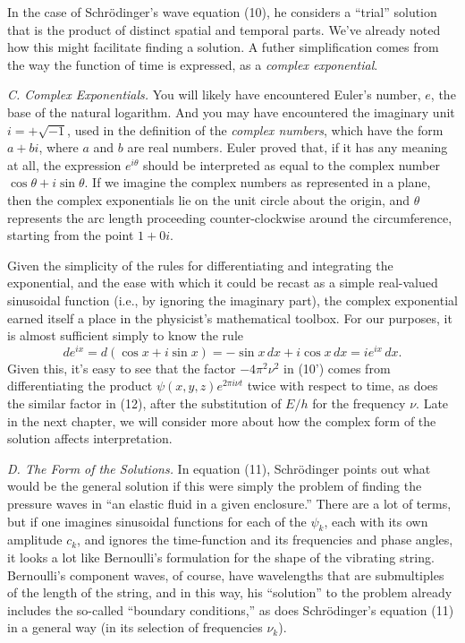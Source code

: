 In the case of Schrödinger's wave equation (10), he considers a ``trial'' solution that is the product
of distinct spatial and temporal parts. We've already noted how this might facilitate finding a solution.
A futher simplification comes from the way the function of time is expressed, as a \emph{complex exponential}.

\vspace{5pt}
\emph{C. Complex Exponentials.} You will likely have encountered Euler's number, $e$, the base of the natural logarithm. And you may have encountered the imaginary unit $i = +\sqrt{-1}$, used in the definition of the \emph{complex numbers}, which have the form $a + bi$, where $a$ and $b$ are real numbers. Euler proved that, if it has any meaning at all, the expression $e^{i\theta}$ should be interpreted as equal to the complex number $\cos{\theta} + i\sin{\theta}$. If we imagine the complex numbers as represented in a plane, then the complex exponentials lie on the unit circle about the origin, and $\theta$ represents the arc length proceeding counter-clockwise around the circumference, starting from the point $1 + 0i$. 

Given the simplicity of the rules for differentiating and integrating the exponential, and the ease
with which it could be recast as a simple real-valued sinusoidal function (i.e.,
by ignoring the imaginary part), the complex exponential earned itself a place in the physicist's
mathematical toolbox. For our purposes, it is almost sufficient simply to know the rule
\begin{equation*}
de^{ix} = d(\cos{x} + i\sin{x}) = -\sin{x}\, dx + i\cos{x}\, dx = ie^{ix}\, dx.
\end{equation*}
Given this, it's easy to see that the factor $-4\pi^2\nu^2$ in (10') comes from differentiating the product
$\psi(x,y,z)e^{2\pi i\nu t}$ twice with respect to time, as does the similar factor in (12), after
the substitution of $E/h$ for the frequency $\nu$. Late in the next chapter, we will consider
more about how the complex form of the solution affects interpretation.

\vspace{5pt}
\emph{D. The Form of the Solutions.} In equation (11), Schrödinger points out what would be the
general solution if this were
simply the problem of finding the pressure waves in ``an elastic fluid in a given enclosure.''
There are a lot of terms, but if one imagines sinusoidal functions for each of the $\psi_k$, each
with its own amplitude $c_k$, and ignores the time-function and its frequencies and phase angles, 
it looks a lot like Bernoulli's 
formulation for the shape of the vibrating string. Bernoulli's component waves, of course, have
wavelengths that are submultiples of the length of the string, and in this way, his ``solution''
to the problem already includes the so-called ``boundary conditions,'' as does Schrödinger's
equation (11) in a general way (in its selection of frequencies $\nu_k$).

